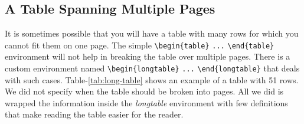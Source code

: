 \subsection{A Table Spanning Multiple Pages}

It is sometimes possible that you will have a table with many rows for which you cannot fit them on one page. The simple \verb|\begin{table}| \verb|...| \verb|\end{table}| environment will not help in breaking the table over multiple pages. There is a custom environment named \verb|\begin{longtable}| \verb|...| \verb|\end{longtable}| that deals with such cases. Table-\ref{tab:long-table} shows an example of a table with 51 rows. We did not specify when the table should be broken into pages. All we did is wrapped the information inside the \emph{longtable} environment with few definitions that make reading the table easier for the reader.

